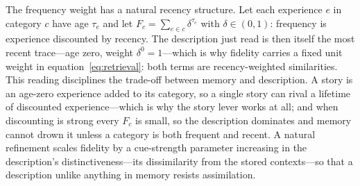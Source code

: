 \documentclass[11pt]{article}
\theoremstyle{plain}
\theoremstyle{remark}
\begin{document}
The frequency weight has a natural recency structure. Let each experience $e$ in category $c$ have age $\tau_{e}$ and let $F_{c}=\sum_{e\in c}\delta^{\tau_{e}}$ with $\delta\in(0,1)$: frequency is experience discounted by recency. The description just read is then itself the most recent trace---age zero, weight $\delta^{0}=1$---which is why fidelity carries a fixed unit weight in equation~\eqref{eq:retrieval}: both terms are recency-weighted similarities. This reading disciplines the trade-off between memory and description. A story is an age-zero experience added to its category, so a single story can rival a lifetime of discounted experience---which is why the story lever works at all; and when discounting is strong every $F_{c}$ is small, so the description dominates and memory cannot drown it unless a category is both frequent and recent. A natural refinement scales fidelity by a cue-strength parameter increasing in the description's distinctiveness---its dissimilarity from the stored contexts---so that a description unlike anything in memory resists assimilation.
\end{document}
